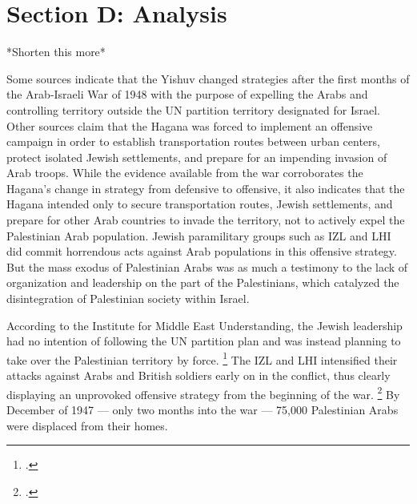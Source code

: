 \documentclass[12pt]{turabian-researchpaper}
\begin{document}

\section{Section D: Analysis}

*Shorten this more*

Some sources indicate that the Yishuv changed strategies after the first months of the Arab-Israeli War of 1948 with the purpose of expelling the Arabs and controlling territory outside the UN partition territory designated for Israel.  Other sources claim that the Hagana was forced to implement an offensive campaign in order to establish transportation routes between urban centers, protect isolated Jewish settlements, and prepare for an impending invasion of Arab troops.
While the evidence available from the war corroborates the Hagana's change in strategy from defensive to offensive, it also indicates that the Hagana intended only to secure transportation routes, Jewish settlements, and prepare for other Arab countries to invade the territory, not to actively expel the Palestinian Arab population.  Jewish paramilitary groups such as IZL and LHI did commit horrendous acts against Arab populations in this offensive strategy.  But the mass exodus of Palestinian Arabs was as much a testimony to the lack of organization and leadership on the part of the Palestinians, which catalyzed the disintegration of Palestinian society within Israel.


According to the Institute for Middle East Understanding, the Jewish leadership had no intention of following the UN partition plan and was instead planning to take over the Palestinian territory by force.
\footcite{nabka}
The IZL and LHI intensified their attacks against Arabs and British soldiers early on in the conflict, thus clearly displaying an unprovoked offensive strategy from the beginning of the war.
\footcite{nabka}
By December of 1947 --- only two months into the war --- 75,000 Palestinian Arabs were displaced from their homes.
\end{document}
